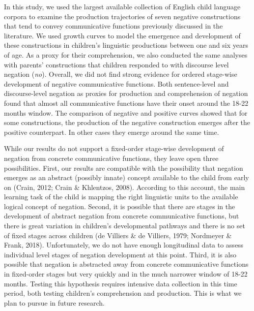 \documentclass[
  man,floatsintext]{apa6}
\begin{document}
In this study, we used the largest available collection of English child language corpora to examine the production trajectories of seven negative constructions that tend to convey communicative functions previously discussed in the literature. We used growth curves to model the emergence and development of these constructions in children's linguistic productions between one and six years of age. As a proxy for their comprehension, we also conducted the same analyses with parents' constructions that children responded to with discourse level negation (\emph{no}). Overall, we did not find strong evidence for ordered stage-wise development of negative communicative functions. Both sentence-level and discourse-level negation as proxies for production and comprehension of negation found that almost all communicative functions have their onset around the 18-22 months window. The comparison of negative and positive curves showed that for some constructions, the production of the negative construction emerges after the positive counterpart. In other cases they emerge around the same time.

While our results do not support a fixed-order stage-wise development of negation from concrete communicative functions, they leave open three possibilities. First, our results are compatible with the possibility that negation emerges as an abstract (possibly innate) concept available to the child from early on (Crain, 2012; Crain \& Khlentzos, 2008). According to this account, the main learning task of the child is mapping the right linguistic units to the available logical concept of negation. Second, it is possible that there are stages in the development of abstract negation from concrete communicative functions, but there is great variation in children's developmental pathways and there is no set of fixed stages across children (de Villiers \& de Villiers, 1979; Nordmeyer \& Frank, 2018). Unfortunately, we do not have enough longitudinal data to assess individual level stages of negation development at this point. Third, it is also possible that negation is abstracted away from concrete communicative functions in fixed-order stages but very quickly and in the much narrower window of 18-22 months. Testing this hypothesis requires intensive data collection in this time period, both testing children's comprehension and production. This is what we plan to pursue in future research.
\end{document}
